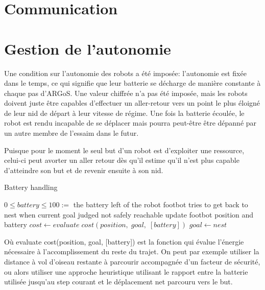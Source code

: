 \section{Communication\label{sec:commu}}

\section{Gestion de l'autonomie}
Une condition sur l'autonomie des robots a été imposée: l'autonomie est fixée dans le temps, ce qui signifie que leur batterie se décharge de manière constante à chaque pas d'ARGoS. Une valeur chiffrée n'a pas été imposée, mais les robots doivent juste être capables d'effectuer un aller-retour vers un point le plus éloigné de leur nid de départ à leur vitesse de régime. Une fois la batterie écoulée, le robot est rendu incapable de se déplacer mais pourra peut-être être dépanné par un autre membre de l'essaim dans le futur.

Puisque pour le moment le seul but d'un robot est d'exploiter une ressource, celui-ci peut avorter un aller retour dès qu'il estime qu'il n'est plus capable d'atteindre son but et de revenir ensuite à son nid.

\begin{algorithm}                    
\caption{Battery handling}
\label{algo:batterie}
\begin{algorithmic}[1]
  \REQUIRE \(0 \leq battery \leq 100 :=\) the battery left of the robot
  \ENSURE footbot tries to get back to nest when current goal judged not safely reachable
    \STATE update footbot position and battery
    \STATE \(cost \leftarrow evaluate\;cost(position,\;goal,\;[battery])\) 
      \STATE \(goal \leftarrow nest\) 
    \ENDIF
  \ENDWHILE
\end{algorithmic}
\end{algorithm}
Où evaluate cost(position, goal, [battery]) est la fonction qui évalue l'énergie nécessaire à l'accomplissement du reste du trajet. On peut par exemple utiliser la distance à vol d'oiseau restante à parcourir accompagnée d'un facteur de sécurité, ou alors utiliser une approche heuristique utilisant le rapport entre la batterie utilisée jusqu'au step courant et le déplacement net parcouru vers le but.

